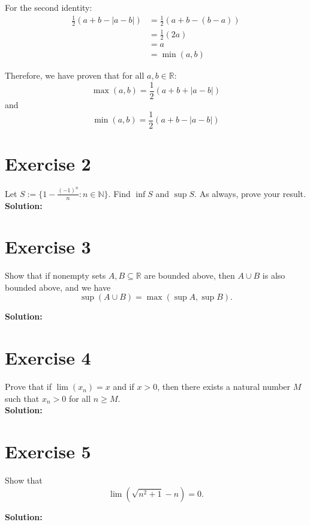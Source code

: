 \documentclass{article}
\begin{document}
For the second identity:
\begin{align*}
\frac{1}{2}(a + b - |a-b|) &= \frac{1}{2}(a + b - (b-a)) \\
&= \frac{1}{2}(2a) \\
&= a \\
&= \min(a,b)
\end{align*}

Therefore, we have proven that for all $a, b \in \mathbb{R}$:
\[\max(a,b) = \frac{1}{2}(a + b + |a-b|)\]
and
\[\min(a,b) = \frac{1}{2}(a + b - |a-b|)\]

\newpage

\section*{Exercise 2}
Let $S := \{1-\frac{(-1)^n}{n} : n \in \mathbb{N}\}$. Find $\inf S$ and $\sup S$. As always, prove your result. \\

\textbf{Solution:} \\



\newpage

\section*{Exercise 3}
Show that if nonempty sets $A, B \subseteq \mathbb{R}$ are bounded above, then $A \cup B$ is also bounded above, and we have
\[\sup(A \cup B) = \max(\sup A, \sup B).\]

\textbf{Solution:} \\



\newpage

\section*{Exercise 4}
Prove that if $\lim(x_n) = x$ and if $x > 0$, then there exists a natural number $M$ such that $x_n > 0$ for all $n \geq M$. \\

\textbf{Solution:} \\



\newpage

\section*{Exercise 5}
Show that
\[\lim\left(\sqrt{n^2 + 1} - n\right) = 0.\]

\textbf{Solution:} \\
\end{document}
